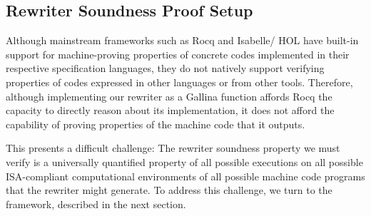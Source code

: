 \subsection{Rewriter Soundness Proof Setup}

Although mainstream \FM frameworks such as Rocq and Isabelle/ HOL have built-in support for machine-proving properties of concrete codes implemented in their respective specification languages, they do not natively support verifying properties of codes expressed in other languages or from other tools.
Therefore, although implementing our rewriter as a Gallina function affords Rocq the capacity to directly reason about its implementation, it does not afford the capability of proving properties of the machine code that it outputs.

This presents a difficult \FM challenge:
The rewriter soundness property we must verify is a universally quantified property of all possible executions on all possible ISA-compliant computational environments of all possible machine code programs that the rewriter might generate.
To address this challenge, we turn to the \Picinae{} framework, described in the next section.

